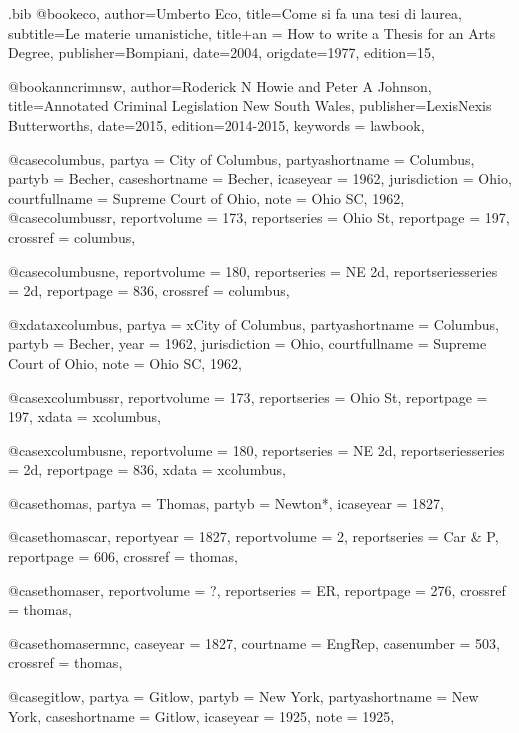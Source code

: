 \begin{filecontents*}{\jobname.bib}
@book{eco,
author={Umberto Eco},
title={Come si fa una tesi di laurea},
subtitle={Le materie umanistiche},
title+an = {How to write a Thesis for an Arts Degree},
publisher={Bompiani},
date={2004},
origdate={1977},
edition={15},
}

@book{anncrimnsw,
author={Roderick N Howie and Peter A Johnson},
title={Annotated Criminal Legislation New South Wales},
publisher={LexisNexis Butterworths},
date={2015},
edition={2014-2015},
keywords = {lawbook},
}

@case{columbus,
  partya = {City of Columbus},
  partyashortname = {Columbus}, 
  partyb = {Becher},
  caseshortname = {Becher},
  icaseyear = {1962},
  jurisdiction = {Ohio},
  courtfullname = {Supreme Court of Ohio},
  note = {Ohio SC, 1962},
	}
@case{columbussr,
  reportvolume = {173},
  reportseries = {Ohio St},
  reportpage = {197},
  crossref = {columbus},
}

@case{columbusne,
  reportvolume = {180},
  reportseries = {NE 2d},
  reportseriesseries = {2d},
  reportpage = {836},
  crossref = {columbus},
}

@xdata{xcolumbus,
  partya = {xCity of Columbus},
  partyashortname = {Columbus}, 
  partyb = {Becher},
  year = {1962},
  jurisdiction = {Ohio},
  courtfullname = {Supreme Court of Ohio},
  note = {Ohio SC, 1962},
	}
	
@case{xcolumbussr,
  reportvolume = {173},
  reportseries = {Ohio St},
  reportpage = {197},
  xdata = {xcolumbus},
}

@case{xcolumbusne,
  reportvolume = {180},
  reportseries = {NE 2d},
  reportseriesseries = {2d},
  reportpage = {836},
  xdata = {xcolumbus},
}


@case{thomas,
  partya = {Thomas},
  partyb = {Newton*},
  icaseyear = {1827},
	}

@case{thomascar,
  reportyear = {1827},
  reportvolume = {2},
  reportseries = {Car \& P},
  reportpage = {606},
  crossref = {thomas},
}

@case{thomaser,
  reportvolume = {?},
  reportseries = {ER},
  reportpage = {276},
  crossref = {thomas},
}

@case{thomasermnc,
  caseyear = {1827},
  courtname = {EngRep},
  casenumber = {503},
  crossref = {thomas},
}


@case{gitlow,
  partya = {Gitlow},
  partyb = {New York},%
  partyashortname = {New York}, 
  caseshortname = {Gitlow},
  icaseyear = {1925},
  note = {1925},
	}



\end{filecontents*}
